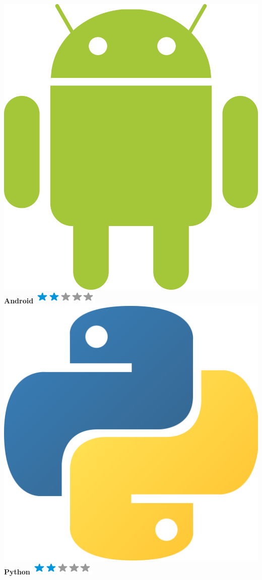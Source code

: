 \documentclass[a4paper]{friggeri-cv}
\begin{document}
\begin{aside}
    \includegraphics[scale=0.0047]{img/Android_logo.png} \textbf{Android}\includegraphics[scale=0.40]{img/2stars.png}
     \includegraphics[scale=0.0045]{img/Python_logo.png} \textbf{Python}\includegraphics[scale=0.40]{img/2stars.png}

\end{aside}
\end{document}

